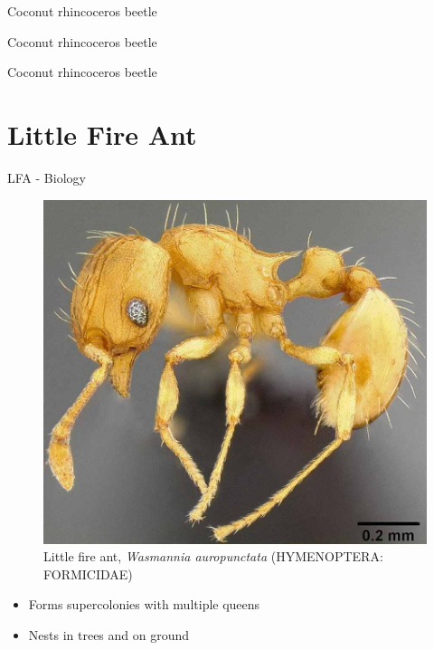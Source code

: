 \documentclass[]{beamer}
\begin{document}
\begin{frame}{Coconut rhincoceros beetle}
\end{frame}

\begin{frame}{Coconut rhincoceros beetle}
\end{frame}

\begin{frame}{Coconut rhincoceros beetle}
\end{frame}

\section{Little Fire Ant}

\begin{frame}{LFA - Biology}
	\begin{figure}
	\includegraphics[height=0.6\textheight]{lfa.jpg}
	\caption{Little fire ant, \textit{Wasmannia auropunctata} (HYMENOPTERA: FORMICIDAE)}
	\end{figure}
	\begin{itemize}
		\item Forms supercolonies with multiple queens
		\item Nests in trees and on ground
	\end{itemize}
\end{frame}
\end{document}
